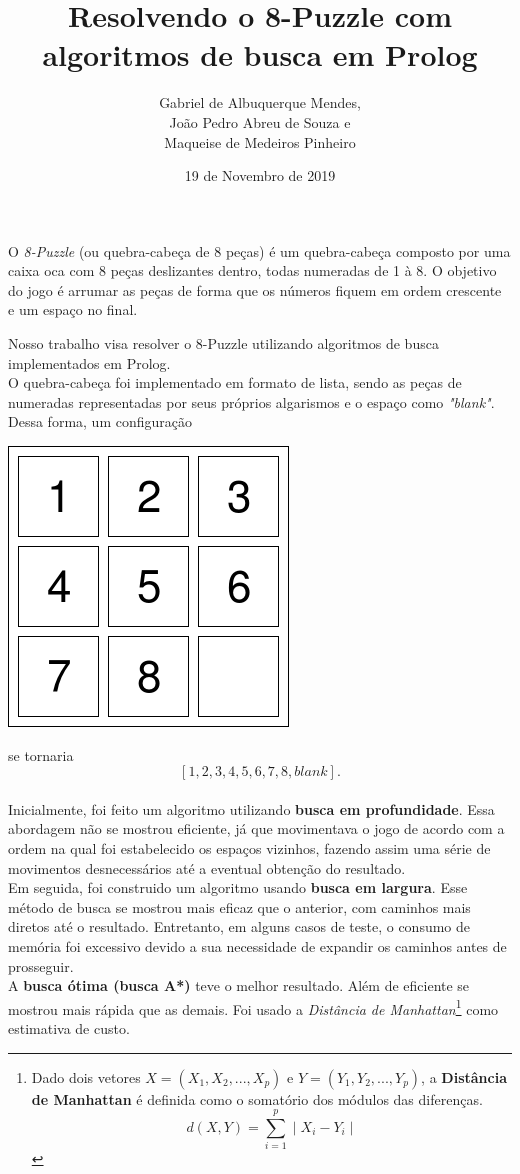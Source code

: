\documentclass[12pt,a4paper]{article}
\author{Gabriel de Albuquerque Mendes,\\
 João Pedro Abreu de Souza e \\
 Maqueise de Medeiros Pinheiro}
\title{Resolvendo o 8-Puzzle com algoritmos de busca em Prolog}
\date{19 de Novembro de 2019}
\begin{document}
\maketitle
O \textit{8-Puzzle} (ou quebra-cabeça de 8 peças) é um quebra-cabeça composto por uma caixa oca com 8 peças deslizantes dentro, todas numeradas de 1 à 8. O objetivo do jogo é arrumar as peças de forma que os números fiquem em ordem crescente e um espaço no final.

Nosso trabalho visa resolver o 8-Puzzle utilizando algoritmos de busca implementados em Prolog.
\\

O quebra-cabeça foi implementado em formato de lista, sendo as peças de numeradas representadas por seus próprios algarismos e o espaço como \textit{"blank"}. Dessa forma, um configuração
\begin{center}
\includegraphics[scale=0.5]{8puzzle.png} 
\end{center} 
se tornaria $$[1,2,3,4,5,6,7,8,blank].$$
\\

Inicialmente, foi feito um algoritmo utilizando \textbf{busca em profundidade}. Essa abordagem não se mostrou eficiente, já que movimentava o jogo de acordo com a ordem na qual foi estabelecido os espaços vizinhos, fazendo assim uma série de movimentos desnecessários até a eventual obtenção do resultado.
\\

Em seguida, foi construido um algoritmo usando \textbf{busca em largura}. Esse método de busca se mostrou mais eficaz que o anterior, com caminhos mais diretos até o resultado. Entretanto, em alguns casos de teste, o consumo de memória foi excessivo devido a sua necessidade de expandir os caminhos antes de prosseguir.
\\

A \textbf{busca ótima (busca A*)} teve o melhor resultado. Além de eficiente se mostrou mais rápida que as demais. Foi usado a \textit{Distância de Manhattan}\footnote{Dado dois vetores $X=(X_1,X_2,...,X_p)$ e $Y=(Y_1,Y_2,...,Y_p)$, a \textbf{Distância de Manhattan} é definida como o somatório dos módulos das diferenças. $$d(X,Y)= \sum_{i=1}^{p} \mid X_i - Y_i \mid$$} como estimativa de custo.
\end{document}
